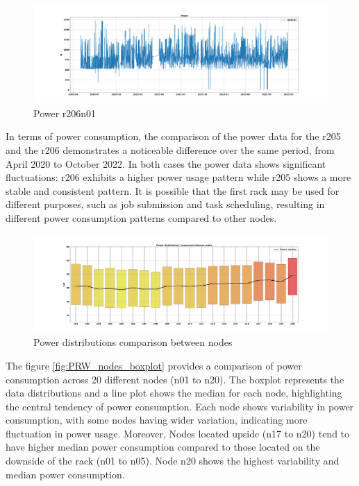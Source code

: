 \begin{figure}[H]
    \centering
    \includegraphics[width=1\textwidth]{Figures/PWR_r206n01.png}
    \caption{Power r206n01}
    \label{fig:PWR_r206n01}
\end{figure}

In terms of power consumption, the comparison of the power data for the r205 and the r206 demonstrates a noticeable difference over the same period, from April 2020 to October 2022.
In both cases the power data shows significant fluctuations: r206 exhibits a higher power usage pattern while r205 shows a more stable and consistent pattern.
It is possible that the first rack may be used for different purposes, such as job submission and task scheduling, resulting in different power consumption patterns compared to other nodes.

\begin{figure}[H]
    \centering
    \includegraphics[width=1\textwidth]{Figures/PWR_nodes_boxplot.png}
    \caption{Power distributions comparison between nodes}
    \label{fig:PWR_nodes_boxplot}
\end{figure}

The figure \ref{fig:PRW_nodes_boxplot} provides a comparison of power consumption across 20 different nodes (n01 to n20).
The boxplot represents the data distributions and a line plot shows the median for each node, highlighting the central tendency of power consumption.
Each node shows variability in power consumption, with some nodes having wider variation, indicating more fluctuation in power usage.
Moreover, Nodes located upside (n17 to n20) tend to have higher median power consumption compared to those located on the downside of the rack (n01 to n05). Node n20 shows the highest variability and median power consumption.

